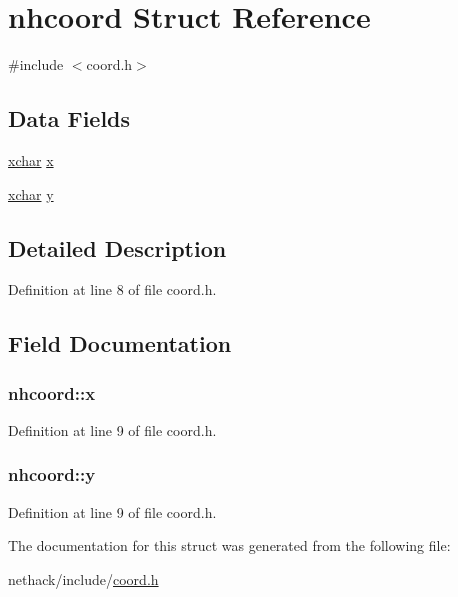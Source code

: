 \hypertarget{structnhcoord}{\section{nhcoord Struct Reference}
\label{structnhcoord}
}


{\ttfamily \#include $<$coord.\+h$>$}

\subsection*{Data Fields}
\begin{DoxyCompactItemize}
\item 
\hyperlink{global_8h_a2043b7d01ce89f4ee2fa6c345a752d32}{xchar} \hyperlink{structnhcoord_aff5b038121182a3770e067b2aa81227d}{x}
\item 
\hyperlink{global_8h_a2043b7d01ce89f4ee2fa6c345a752d32}{xchar} \hyperlink{structnhcoord_ad8e39242475e53f59423bfa8ee4b5cf3}{y}
\end{DoxyCompactItemize}


\subsection{Detailed Description}


Definition at line 8 of file coord.\+h.



\subsection{Field Documentation}
\hypertarget{structnhcoord_aff5b038121182a3770e067b2aa81227d}{
\subsubsection[{x}]{ nhcoord\+::x}}\label{structnhcoord_aff5b038121182a3770e067b2aa81227d}


Definition at line 9 of file coord.\+h.

\hypertarget{structnhcoord_ad8e39242475e53f59423bfa8ee4b5cf3}{
\subsubsection[{y}]{ nhcoord\+::y}}\label{structnhcoord_ad8e39242475e53f59423bfa8ee4b5cf3}


Definition at line 9 of file coord.\+h.



The documentation for this struct was generated from the following file\+:\begin{DoxyCompactItemize}
\item 
nethack/include/\hyperlink{coord_8h}{coord.\+h}\end{DoxyCompactItemize}
